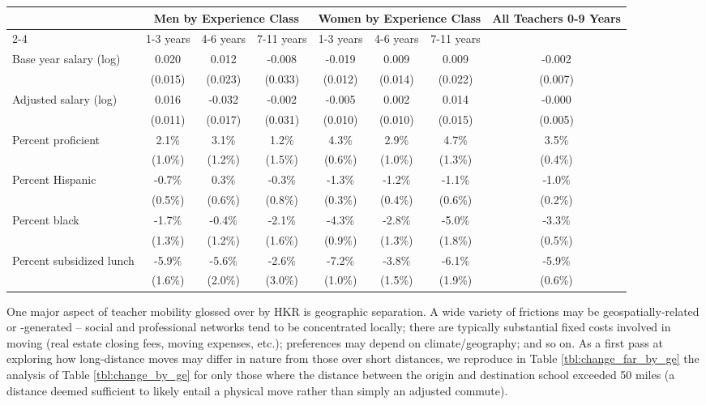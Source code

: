 \documentclass[12pt,]{article}
\begin{document}
\begin{sidewaystable}[htbp]
\centering
\begin{tabular}{lccccccc}
  \hline
 & \multicolumn{3}{c}{Men by Experience Class} & \multicolumn{3}{c}{Women by Experience Class} & \multirow{2}{*}{\parbox{0.1\linewidth}{All Teachers 0-9 Years}}\\ \cline{2-4} \cline{5-7}
 & 1-3 years & 4-6 years & 7-11 years & 1-3 years & 4-6 years & 7-11 years &  \\ 
  \hline
Base year salary (log) & 0.020 & 0.012 & -0.008 & -0.019 & 0.009 & 0.009 & -0.002 \\ 
   & (0.015) & (0.023) & (0.033) & (0.012) & (0.014) & (0.022) & (0.007) \\ 
  Adjusted salary (log) & 0.016 & -0.032 & -0.002 & -0.005 & 0.002 & 0.014 & -0.000 \\ 
   & (0.011) & (0.017) & (0.031) & (0.010) & (0.010) & (0.015) & (0.005) \\ 
  Percent proficient & 2.1\% & 3.1\% & 1.2\% & 4.3\% & 2.9\% & 4.7\% & 3.5\% \\ 
   & (1.0\%) & (1.2\%) & (1.5\%) & (0.6\%) & (1.0\%) & (1.3\%) & (0.4\%) \\ 
  Percent Hispanic & -0.7\% & 0.3\% & -0.3\% & -1.3\% & -1.2\% & -1.1\% & -1.0\% \\ 
   & (0.5\%) & (0.6\%) & (0.8\%) & (0.3\%) & (0.4\%) & (0.6\%) & (0.2\%) \\ 
  Percent black & -1.7\% & -0.4\% & -2.1\% & -4.3\% & -2.8\% & -5.0\% & -3.3\% \\ 
   & (1.3\%) & (1.2\%) & (1.6\%) & (0.9\%) & (1.3\%) & (1.8\%) & (0.5\%) \\ 
  Percent subsidized lunch & -5.9\% & -5.6\% & -2.6\% & -7.2\% & -3.8\% & -6.1\% & -5.9\% \\ 
   & (1.6\%) & (2.0\%) & (3.0\%) & (1.0\%) & (1.5\%) & (1.9\%) & (0.6\%) \\ 
   \hline
\end{tabular}
\caption{Average Change in Salary and District Student Characteristics (and Standard Deviations) for Teachers Changing to a district more than 50 Miles Away, by Gender and Experience} 
\label{tbl:change_far_by_ge}
\end{sidewaystable}

One major aspect of teacher mobility glossed over by HKR is geographic
separation. A wide variety of frictions may be geospatially-related or
-generated -- social and professional networks tend to be concentrated
locally; there are typically substantial fixed costs involved in moving
(real estate closing fees, moving expenses, etc.); preferences may
depend on climate/geography; and so on. As a first pass at exploring how
long-distance moves may differ in nature from those over short
distances, we reproduce in Table \ref{tbl:change_far_by_ge} the analysis
of Table \ref{tbl:change_by_ge} for only those where the distance
between the origin and destination school exceeded 50 miles (a distance
deemed sufficient to likely entail a physical move rather than simply an
adjusted commute).
\end{document}
